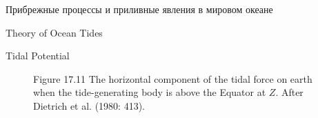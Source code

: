 \begin{chapter}{Прибрежные процессы и приливные явления в мировом океане}
\begin{section}{Theory of Ocean Tides}
\begin{paragraph}{Tidal Potential}
\begin{figure}[t!]
\caption{Figure 17.11 The horizontal component of the tidal
force on earth when the tide-generating body is above the Equator at
$Z$. After Dietrich et al. (1980: 413).}
\label{fig:horiztideforce}
\end{figure}
%
%


\end{paragraph}
\end{section}
\end{chapter}
